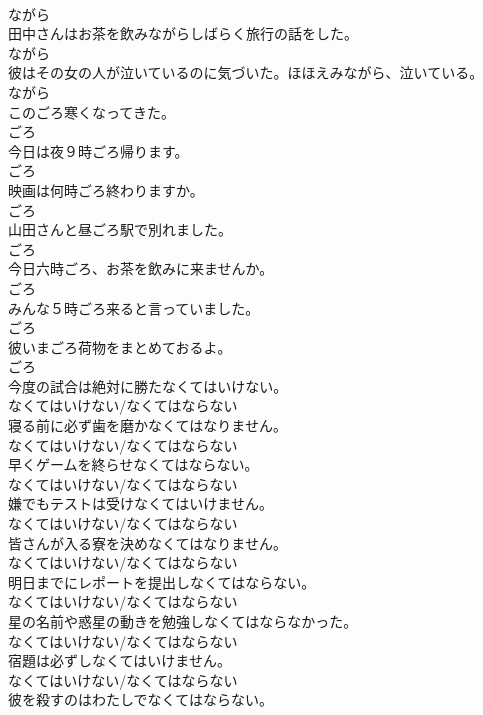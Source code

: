 \documentclass[8pt]{extreport}
\begin{document}
\begin{CJK}{UTF8}{min}
\\	ながら	
\\	田中さんはお茶を飲みながらしばらく旅行の話をした。	
\\	ながら	
\\	彼はその女の人が泣いているのに気づいた。ほほえみながら、泣いている。	
\\	ながら	
\\	このごろ寒くなってきた。	
\\	ごろ	
\\	今日は夜９時ごろ帰ります。	
\\	ごろ	
\\	映画は何時ごろ終わりますか。	
\\	ごろ	
\\	山田さんと昼ごろ駅で別れました。	
\\	ごろ	
\\	今日六時ごろ、お茶を飲みに来ませんか。	
\\	ごろ	
\\	みんな５時ごろ来ると言っていました。	
\\	ごろ	
\\	彼いまごろ荷物をまとめておるよ。	
\\	ごろ	
\\	今度の試合は絶対に勝たなくてはいけない。	
\\	なくてはいけない/なくてはならない	
\\	寝る前に必ず歯を磨かなくてはなりません。	
\\	なくてはいけない/なくてはならない	
\\	早くゲームを終らせなくてはならない。	
\\	なくてはいけない/なくてはならない	
\\	嫌でもテストは受けなくてはいけません。	
\\	なくてはいけない/なくてはならない	
\\	皆さんが入る寮を決めなくてはなりません。	
\\	なくてはいけない/なくてはならない	
\\	明日までにレポートを提出しなくてはならない。	
\\	なくてはいけない/なくてはならない	
\\	星の名前や惑星の動きを勉強しなくてはならなかった。	
\\	なくてはいけない/なくてはならない	
\\	宿題は必ずしなくてはいけません。	
\\	なくてはいけない/なくてはならない	
\\	彼を殺すのはわたしでなくてはならない。	

\end{CJK}
\end{document}
